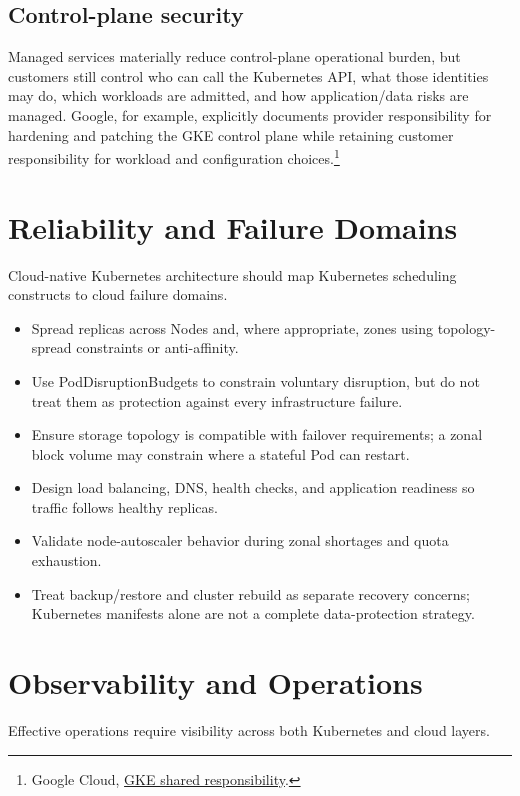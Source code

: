 \documentclass[11pt]{article}
\newcommand{\src}[2]{\href{#2}{#1}}
\begin{document}
\subsection{Control-plane security}
Managed services materially reduce control-plane operational burden, but customers still control who can call the Kubernetes API, what those identities may do, which workloads are admitted, and how application/data risks are managed. Google, for example, explicitly documents provider responsibility for hardening and patching the GKE control plane while retaining customer responsibility for workload and configuration choices.\footnote{Google Cloud, \src{GKE shared responsibility}{https://cloud.google.com/kubernetes-engine/docs/concepts/shared-responsibility}.}

\section{Reliability and Failure Domains}

Cloud-native Kubernetes architecture should map Kubernetes scheduling constructs to cloud failure domains.

\begin{itemize}
  \item Spread replicas across Nodes and, where appropriate, zones using topology-spread constraints or anti-affinity.
  \item Use PodDisruptionBudgets to constrain voluntary disruption, but do not treat them as protection against every infrastructure failure.
  \item Ensure storage topology is compatible with failover requirements; a zonal block volume may constrain where a stateful Pod can restart.
  \item Design load balancing, DNS, health checks, and application readiness so traffic follows healthy replicas.
  \item Validate node-autoscaler behavior during zonal shortages and quota exhaustion.
  \item Treat backup/restore and cluster rebuild as separate recovery concerns; Kubernetes manifests alone are not a complete data-protection strategy.
\end{itemize}

\section{Observability and Operations}

Effective operations require visibility across both Kubernetes and cloud layers.
\end{document}
